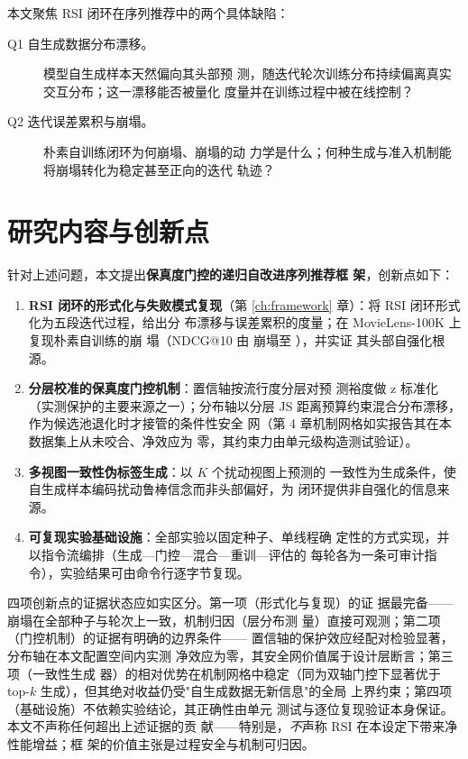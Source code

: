 本文聚焦 RSI 闭环在序列推荐中的两个具体缺陷：

\begin{description}
\item[Q1 自生成数据分布漂移。] 模型自生成样本天然偏向其头部预
测，随迭代轮次训练分布持续偏离真实交互分布；这一漂移能否被量化
度量并在训练过程中被在线控制？
\item[Q2 迭代误差累积与崩塌。] 朴素自训练闭环为何崩塌、崩塌的动
力学是什么；何种生成与准入机制能将崩塌转化为稳定甚至正向的迭代
轨迹？
\end{description}

\section{研究内容与创新点}
针对上述问题，本文提出\textbf{保真度门控的递归自改进序列推荐框
架}，创新点如下：

\begin{enumerate}
\item \textbf{RSI 闭环的形式化与失败模式复现}（第
\ref{ch:framework} 章）：将 RSI 闭环形式化为五段迭代过程，给出分
布漂移与误差累积的度量；在 MovieLens-100K 上复现朴素自训练的崩
塌（NDCG@10 由 \ExpNaiveStart{} 崩塌至 \ExpNaiveEnd{}），并实证
其头部自强化根源。
\item \textbf{分层校准的保真度门控机制}：置信轴按流行度分层对预
测裕度做 z 标准化（实测保护的主要来源之一）；分布轴以分层 JS
距离预算约束混合分布漂移，作为候选池退化时才接管的条件性安全
网（第 4 章机制网格如实报告其在本数据集上从未咬合、净效应为
零，其约束力由单元级构造测试验证）。
\item \textbf{多视图一致性伪标签生成}：以 $K$ 个扰动视图上预测的
一致性为生成条件，使自生成样本编码扰动鲁棒信念而非头部偏好，为
闭环提供非自强化的信息来源。
\item \textbf{可复现实验基础设施}：全部实验以固定种子、单线程确
定性的方式实现，并以指令流编排（生成—门控—混合—重训—评估的
每轮各为一条可审计指令），实验结果可由命令行逐字节复现。
\end{enumerate}

四项创新点的证据状态应如实区分。第一项（形式化与复现）的证
据最完备——崩塌在全部种子与轮次上一致，机制归因（层分布测
量）直接可观测；第二项（门控机制）的证据有明确的边界条件——
置信轴的保护效应经配对检验显著，分布轴在本文配置空间内实测
净效应为零，其安全网价值属于设计层断言；第三项（一致性生成
器）的相对优势在机制网格中稳定（同为双轴门控下显著优于
top-$k$ 生成），但其绝对收益仍受"自生成数据无新信息"的全局
上界约束；第四项（基础设施）不依赖实验结论，其正确性由单元
测试与逐位复现验证本身保证。本文不声称任何超出上述证据的贡
献——特别是，\emph{不}声称 RSI 在本设定下带来净性能增益；框
架的价值主张是过程安全与机制可归因。


